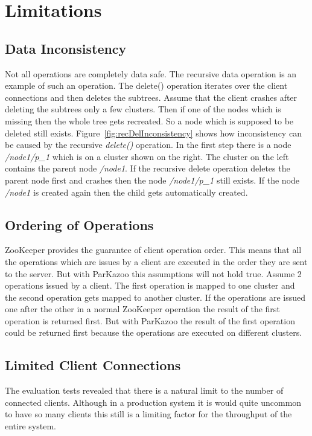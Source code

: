 \chapter{Limitations}

\section{Data Inconsistency}



Not all operations are completely data safe. The recursive data operation is an example of such an operation. The delete() operation iterates over the client connections and then deletes the subtrees. Assume that the client crashes after deleting the subtrees only a few clusters. Then if one of the nodes which is missing then the whole tree gets recreated. So a node which is supposed to be deleted still exists. Figure~\ref{fig:recDelInconsistency} shows how inconsistency can be caused by the recursive \textit{delete()} operation. In the first step there is a node \textit{/node1/p\_1} which is on a cluster shown on the right. The cluster on the left contains the parent node \textit{/node1}. If the recursive delete operation deletes the parent node first and crashes then the node \textit{/node1/p\_1} still exists. If the node \textit{/node1} is created again then the child gets automatically created.

\section{Ordering of Operations}
ZooKeeper provides the guarantee of client operation order. This means that all the operations which are issues by a client are executed in the order they are sent to the server. But with ParKazoo this assumptions will not hold true. Assume 2 operations issued by a client. The first operation is mapped to one cluster and the second operation gets mapped to another cluster. If the operations are issued one after the other in a normal ZooKeeper operation the result of the first operation is returned first. But with ParKazoo the result of the first operation could be returned first because the operations are executed on different clusters.

\section{Limited Client Connections}
The evaluation tests revealed that there is a natural limit to the number of connected clients. Although in a production system it is would quite uncommon to have so many clients this still is a limiting factor for the throughput of the entire system.
